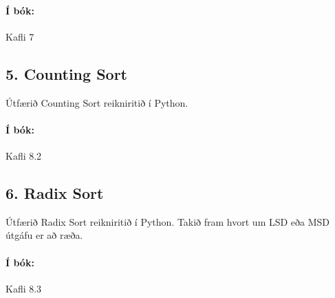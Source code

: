 \documentclass{article}
\begin{document}
\paragraph{Í bók:} Kafli 7
\subsection{5. Counting Sort}
Útfærið Counting Sort reikniritið í Python.

\paragraph{Í bók:} Kafli 8.2
\subsection{6. Radix Sort}
Útfærið Radix Sort reikniritið í Python. Takið fram hvort um LSD eða MSD útgáfu er að ræða.

\paragraph{Í bók:} Kafli 8.3
\end{document}
